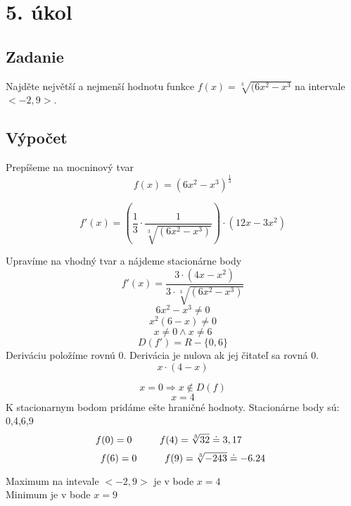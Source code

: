 \section{5. úkol}
\subsection{Zadanie}
 Najděte největší a nejmenší hodnotu funkce $f(x)=\sqrt[3]{(6x^2-x^3} $ na intervale $ <-2,9>$.
\subsection{Výpočet}
Prepíšeme na mocninový tvar
\begin{displaymath}
f(x)=(6x^2-x^3)^\frac{1}{3}
\end{displaymath}

\begin{displaymath}
f'(x)=\left(\frac{1}{3}\cdot\frac{1}{\sqrt[3]{(6x^2-x^3)}}\right)\cdot(12x-3x^2)
\end{displaymath}

Upravíme na vhodný tvar a nájdeme stacionárne body
\begin{displaymath}
f'(x)=\frac{3\cdot(4x-x^2)}{3\cdot\sqrt[3]{(6x^2-x^3)}}
\end{displaymath}
\begin{displaymath}
6x^2-x^3\neq0
\end{displaymath}
\begin{displaymath}
x^2(6-x)\neq0
\end{displaymath}
\begin{displaymath}
x\neq0 \wedge  x\neq6
\end{displaymath}
\begin{displaymath}
D(f')=R-\{0,6\}
\end{displaymath}
Deriváciu položíme rovnú 0. Derivácia je nulova ak jej čitateľ sa rovná 0.
\begin{displaymath}
x\cdot(4-x)
\end{displaymath}

\begin{displaymath}
x=0 \Rightarrow x\notin D(f)
\end{displaymath}
\begin{displaymath}
x=4
\end{displaymath}
K stacionarnym bodom pridáme ešte hraničné hodnoty. 
Stacionárne body sú: 0,4,6,9 
\begin{displaymath}
f(0)=0 \hspace{10mm} f(4)=\sqrt[3]{32}\doteq 3,17 \hspace{10mm}
\end{displaymath}
\begin{displaymath}
f(6)=0 \hspace{10mm} f(9)=\sqrt[3]{-243}\doteq -6.24
\end{displaymath}
\begin{center}
\large{Maximum na intevale $ <-2,9>$ je v bode $x=4$ \\
 Minimum je v bode $x=9$}
\end{center}
